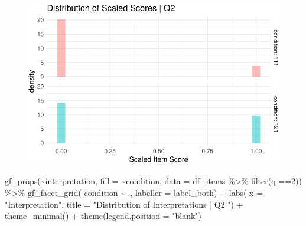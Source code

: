 \documentclass[
  letterpaper,
  DIV=11,
  numbers=noendperiod]{scrreprt}
\newenvironment{Shaded}{\begin{snugshade}}{\end{snugshade}}
\newcommand{\AttributeTok}[1]{\textcolor[rgb]{0.40,0.45,0.13}{#1}}
\newcommand{\DecValTok}[1]{\textcolor[rgb]{0.68,0.00,0.00}{#1}}
\newcommand{\FunctionTok}[1]{\textcolor[rgb]{0.28,0.35,0.67}{#1}}
\newcommand{\NormalTok}[1]{\textcolor[rgb]{0.00,0.23,0.31}{#1}}
\newcommand{\SpecialCharTok}[1]{\textcolor[rgb]{0.37,0.37,0.37}{#1}}
\newcommand{\StringTok}[1]{\textcolor[rgb]{0.13,0.47,0.30}{#1}}
\begin{document}
\begin{figure}[H]

{\centering \includegraphics{analysis/SGC3A/2_sgc3A_scoring_files/figure-pdf/Q2-distribution-1.pdf}

}

\end{figure}

\begin{Shaded}
\begin{Highlighting}[]
\FunctionTok{gf\_props}\NormalTok{(}\SpecialCharTok{\textasciitilde{}}\NormalTok{interpretation, }\AttributeTok{fill =} \SpecialCharTok{\textasciitilde{}}\NormalTok{condition, }\AttributeTok{data =}\NormalTok{ df\_items }\SpecialCharTok{\%\textgreater{}\%} \FunctionTok{filter}\NormalTok{(q }\SpecialCharTok{==}\DecValTok{2}\NormalTok{)) }\SpecialCharTok{\%\textgreater{}\%} 
  \FunctionTok{gf\_facet\_grid}\NormalTok{( condition }\SpecialCharTok{\textasciitilde{}}\NormalTok{ ., }\AttributeTok{labeller =}\NormalTok{ label\_both) }\SpecialCharTok{+} 
  \FunctionTok{labs}\NormalTok{( }\AttributeTok{x =} \StringTok{"Interpretation"}\NormalTok{, }\AttributeTok{title =} \StringTok{"Distribution of Interpretations | Q2 "}\NormalTok{) }\SpecialCharTok{+} 
  \FunctionTok{theme\_minimal}\NormalTok{() }\SpecialCharTok{+} \FunctionTok{theme}\NormalTok{(}\AttributeTok{legend.position =} \StringTok{"blank"}\NormalTok{)}
\end{Highlighting}
\end{Shaded}
\end{document}
